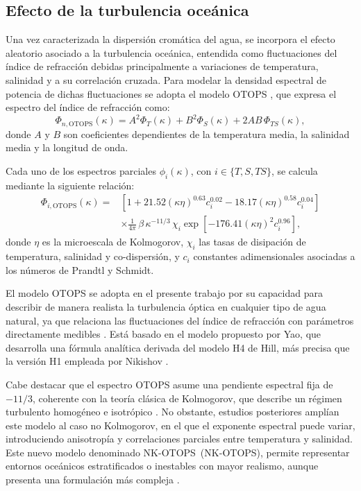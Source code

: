 \subsection{Efecto de la turbulencia oceánica}
Una vez caracterizada la dispersión cromática del agua, se incorpora el efecto aleatorio asociado a la turbulencia oceánica, entendida como fluctuaciones del índice de refracción debidas principalmente a variaciones de temperatura, salinidad y a su correlación cruzada. Para modelar la densidad espectral de potencia de dichas fluctuaciones se adopta el modelo OTOPS \cite{Korotkova,Cai}, que expresa el espectro del índice de refracción como:
\begin{equation}
\Phi_{n,\mathrm{OTOPS}}(\kappa)
= A^2 \Phi_T(\kappa) + B^2 \Phi_S(\kappa) + 2AB\,\Phi_{TS}(\kappa),
\end{equation}
donde $A$ y $B$ son coeficientes dependientes de la temperatura media, la salinidad media y la longitud de onda.

Cada uno de los espectros parciales $\phi_i(\kappa)$, con $i \in \{T, S, TS\}$, se calcula mediante la siguiente relación:
\begin{equation}
\begin{split}
\Phi_{i,\mathrm{OTOPS}}(\kappa)
= {} & \left[ 1
+ 21.52(\kappa \eta)^{0.63} c_i^{0.02}
- 18.17(\kappa \eta)^{0.58} c_i^{0.04} \right]\\
& \times \frac{1}{4\pi}\,\beta\,\kappa^{-11/3}\,\chi_i
\exp\!\left[-176.41(\kappa \eta)^2 c_i^{0.96}\right],
\end{split}
\end{equation}
donde $\eta$ es la microescala de Kolmogorov, $\chi_i$ las tasas de disipación de temperatura, salinidad y co-dispersión, y $c_i$ constantes adimensionales asociadas a los números de Prandtl y Schmidt. 

El modelo OTOPS se adopta en el presente trabajo por su capacidad para describir de manera realista la turbulencia óptica en cualquier tipo de agua natural, ya que relaciona las fluctuaciones del índice de refracción con parámetros directamente medibles \cite{Korotkova, Cai}. Está basado en el modelo propuesto por Yao, que desarrolla una fórmula analítica derivada del modelo H4 de Hill, más precisa que la versión H1 empleada por Nikishov \cite{Wang}. 

Cabe destacar que el espectro OTOPS asume una pendiente espectral fija de $-11/3$, coherente con la teoría clásica de Kolmogorov, que describe un régimen turbulento homogéneo e isotrópico \cite{Baykal}. No obstante, estudios posteriores amplían este modelo al caso no Kolmogorov, en el que el exponente espectral puede variar, introduciendo anisotropía y correlaciones parciales entre temperatura y salinidad. Este nuevo modelo denominado \acs{NK-OTOPS}~(\acl{NK-OTOPS}), permite representar entornos oceánicos estratificados o inestables con mayor realismo, aunque presenta una formulación más compleja \cite{Cai}.

